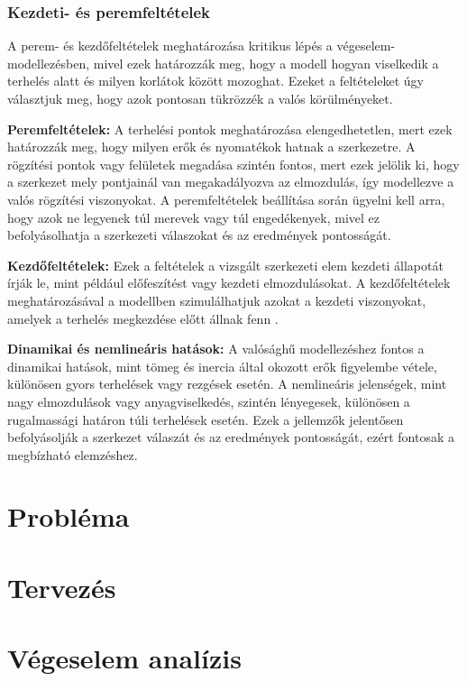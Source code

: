 \documentclass[12pt,a4paper,oneside]{report}
\begin{document}
\subsection{Kezdeti- és peremfeltételek}
A perem- és kezdőfeltételek meghatározása kritikus lépés a végeselem-modellezésben, mivel ezek határozzák meg, hogy a modell hogyan viselkedik a terhelés alatt és milyen korlátok között mozoghat. Ezeket a feltételeket úgy választjuk meg, hogy azok pontosan tükrözzék a valós körülményeket.

\noindent\textbf{Peremfeltételek: }
A terhelési pontok meghatározása elengedhetetlen, mert ezek határozzák meg, hogy milyen erők és nyomatékok hatnak a szerkezetre. A rögzítési pontok vagy felületek megadása szintén fontos, mert ezek jelölik ki, hogy a szerkezet mely pontjainál van megakadályozva az elmozdulás, így modellezve a valós rögzítési viszonyokat. A peremfeltételek beállítása során ügyelni kell arra, hogy azok ne legyenek túl merevek vagy túl engedékenyek, mivel ez befolyásolhatja a szerkezeti válaszokat és az eredmények pontosságát.

\noindent\textbf{Kezdőfeltételek: }
Ezek a feltételek a vizsgált szerkezeti elem kezdeti állapotát írják le, mint például előfeszítést vagy kezdeti elmozdulásokat. A kezdőfeltételek meghatározásával a modellben szimulálhatjuk azokat a kezdeti viszonyokat, amelyek a terhelés megkezdése előtt állnak fenn \cite{mankovits2015modellezes}.

\noindent\textbf{Dinamikai és nemlineáris hatások: }
A valósághű modellezéshez fontos a dinamikai hatások, mint tömeg és inercia által okozott erők figyelembe vétele, különösen gyors terhelések vagy rezgések esetén. A nemlineáris jelenségek, mint nagy elmozdulások vagy anyagviselkedés, szintén lényegesek, különösen a rugalmassági határon túli terhelések esetén. Ezek a jellemzők jelentősen befolyásolják a szerkezet válaszát és az eredmények pontosságát, ezért fontosak a megbízható elemzéshez.

\chapter{Probléma}

\chapter{Tervezés}

\chapter{Végeselem analízis}
\end{document}
